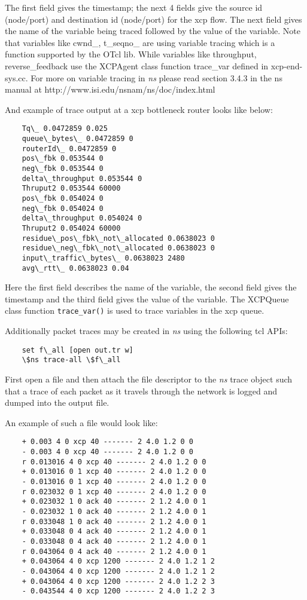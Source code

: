   The first field gives the timestamp; the next 4 fields give the
  source id (node/port) and destination id (node/port) for the xcp
  flow. The next field gives the name of the variable being traced
  followed by the value of the variable. Note that variables like 
  cwnd\_, t\_seqno\_ are using variable tracing which is a function
  supported by the OTcl lib. While variables like throughput,
  reverse\_feedback use the XCPAgent class function trace\_var defined
  in xcp-end-sys.cc. For more on variable tracing in \emph{ns}{} please read
  section 3.4.3 in the ns manual at
  http://www.isi.edu/nsnam/ns/doc/index.html  
    
    
  And example of trace output at a xcp bottleneck router looks like below:
  \begin{verbatim}
    Tq\_ 0.0472859 0.025
    queue\_bytes\_ 0.0472859 0
    routerId\_ 0.0472859 0
    pos\_fbk 0.053544 0
    neg\_fbk 0.053544 0
    delta\_throughput 0.053544 0
    Thruput2 0.053544 60000
    pos\_fbk 0.054024 0
    neg\_fbk 0.054024 0
    delta\_throughput 0.054024 0
    Thruput2 0.054024 60000
    residue\_pos\_fbk\_not\_allocated 0.0638023 0
    residue\_neg\_fbk\_not\_allocated 0.0638023 0
    input\_traffic\_bytes\_ 0.0638023 2480
    avg\_rtt\_ 0.0638023 0.04
  \end{verbatim}
  
  Here the first field describes the name of the variable, the
  second field gives the timestamp and the third field gives the
  value of the variable. The XCPQueue class function {\tt trace\_var()}
  is used to trace variables in the xcp queue.
  
  Additionally packet traces may be created in \emph{ns}{} using the following
  tcl APIs:
  \begin{verbatim}
    set f\_all [open out.tr w]
    \$ns trace-all \$f\_all
  \end{verbatim}
  
  First open a file and then attach the file descriptor to the \emph{ns}{}
  trace object such that a trace of each packet as it travels through
  the network is logged and dumped into the output file.
  
  An example of such a file would look like:
  \begin{verbatim}
    + 0.003 4 0 xcp 40 ------- 2 4.0 1.2 0 0
    - 0.003 4 0 xcp 40 ------- 2 4.0 1.2 0 0
    r 0.013016 4 0 xcp 40 ------- 2 4.0 1.2 0 0
    + 0.013016 0 1 xcp 40 ------- 2 4.0 1.2 0 0
    - 0.013016 0 1 xcp 40 ------- 2 4.0 1.2 0 0
    r 0.023032 0 1 xcp 40 ------- 2 4.0 1.2 0 0
    + 0.023032 1 0 ack 40 ------- 2 1.2 4.0 0 1
    - 0.023032 1 0 ack 40 ------- 2 1.2 4.0 0 1
    r 0.033048 1 0 ack 40 ------- 2 1.2 4.0 0 1
    + 0.033048 0 4 ack 40 ------- 2 1.2 4.0 0 1
    - 0.033048 0 4 ack 40 ------- 2 1.2 4.0 0 1
    r 0.043064 0 4 ack 40 ------- 2 1.2 4.0 0 1
    + 0.043064 4 0 xcp 1200 ------- 2 4.0 1.2 1 2
    - 0.043064 4 0 xcp 1200 ------- 2 4.0 1.2 1 2
    + 0.043064 4 0 xcp 1200 ------- 2 4.0 1.2 2 3
    - 0.043544 4 0 xcp 1200 ------- 2 4.0 1.2 2 3
  \end{verbatim}

